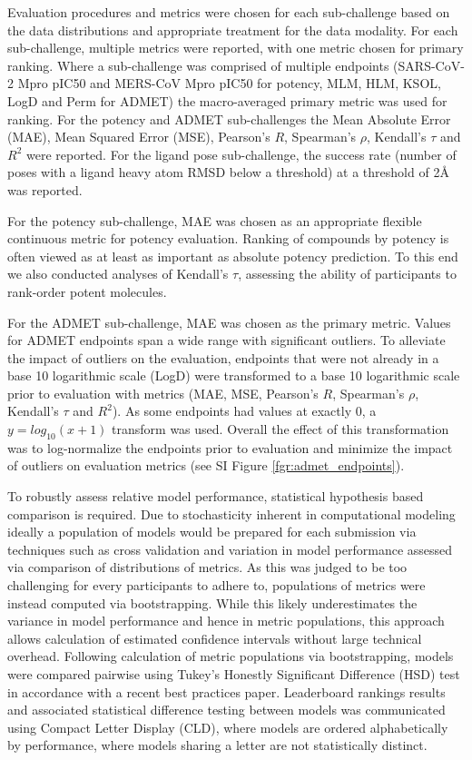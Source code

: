 \documentclass[journal=jcim,manuscript=article]{achemso}
\begin{document}
Evaluation procedures and metrics were chosen for each sub-challenge based on the data distributions and appropriate treatment for the data modality. For each sub-challenge, multiple metrics were reported, with one metric chosen for primary ranking. Where a sub-challenge was comprised of multiple endpoints (SARS-CoV-2 Mpro pIC50 and MERS-CoV Mpro pIC50 for potency, MLM, HLM, KSOL, LogD and Perm for ADMET) the macro-averaged primary metric was used for ranking. For the potency and ADMET sub-challenges the Mean Absolute Error (MAE), Mean Squared Error (MSE), Pearson's $R$, Spearman's $\rho$, Kendall's $\tau$ and $R^2$ were reported. For the ligand pose sub-challenge, the success rate (number of poses with a ligand heavy atom RMSD below a threshold) at a threshold of 2Å was reported.

For the potency sub-challenge, MAE was chosen as an appropriate flexible continuous metric for potency evaluation. Ranking of compounds by potency is often viewed as at least as important as absolute potency prediction. To this end we also conducted analyses of Kendall's $\tau$, assessing the ability of participants to rank-order potent molecules. 

For the ADMET sub-challenge, MAE was chosen as the primary metric. Values for ADMET endpoints span a wide range with significant outliers. To alleviate the impact of outliers on the evaluation, endpoints that were not already in a base 10 logarithmic scale (LogD) were transformed to a base 10 logarithmic scale prior to evaluation with metrics (MAE, MSE, Pearson's $R$, Spearman's $\rho$, Kendall's $\tau$ and $R^2$). As some endpoints had values at exactly 0, a $ y=log_{10}(x + 1)$ transform was used. Overall the effect of this transformation was to log-normalize the endpoints prior to evaluation and minimize the impact of outliers on evaluation metrics (see SI Figure \ref{fgr:admet_endpoints}).

To robustly assess relative model performance, statistical hypothesis based comparison is required\cite{ash_practically_2024}. Due to stochasticity inherent in computational modeling ideally a population of models would be prepared for each submission via techniques such as cross validation and variation in model performance assessed via comparison of distributions of metrics. As this was judged to be too challenging for every participants to adhere to, populations of metrics were instead computed via bootstrapping\cite{efron_bootstrap_1979}. While this likely underestimates the variance in model performance and hence in metric populations, this approach allows calculation of estimated confidence intervals without large technical overhead. Following calculation of metric populations via bootstrapping, models were compared pairwise using Tukey's Honestly Significant Difference (HSD) test in accordance with a recent best practices paper. Leaderboard rankings results and associated statistical difference testing between models was communicated using Compact Letter Display (CLD)\cite{cld_algorithm_2004}, where models are ordered alphabetically by performance, where models sharing a letter are not statistically distinct. 
\end{document}
